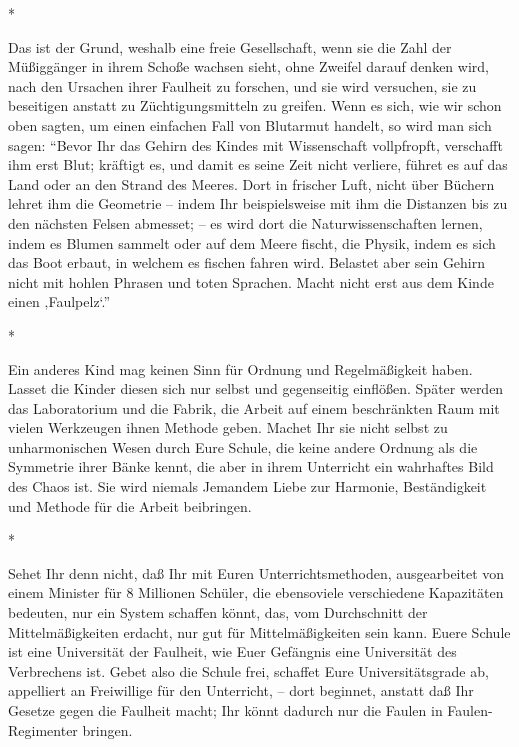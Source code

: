\documentclass{scrbook}
\begin{document}
\begin{center}*\end{center}

Das ist der Grund, weshalb eine freie Gesellschaft, wenn sie die Zahl der Müßiggänger in ihrem Schoße wachsen sieht, ohne Zweifel darauf denken wird, nach den Ursachen ihrer Faulheit zu forschen, und sie wird versuchen, sie zu beseitigen anstatt zu Züchtigungsmitteln zu greifen. Wenn es sich, wie wir schon oben sagten, um einen einfachen Fall von Blutarmut handelt, so wird man sich sagen: ``Bevor Ihr das Gehirn des Kindes mit Wissenschaft vollpfropft, verschafft ihm erst Blut; kräftigt es, und damit es seine Zeit nicht verliere, führet es auf das Land oder an den Strand des Meeres. Dort in frischer Luft, nicht über Büchern lehret ihm die Geometrie – indem Ihr beispielsweise mit ihm die Distanzen bis zu den nächsten Felsen abmesset; – es wird dort die Naturwissenschaften lernen, indem es Blumen sammelt oder auf dem Meere fischt, die Physik, indem es sich das Boot erbaut, in welchem es fischen fahren wird. Belastet aber sein Gehirn nicht mit hohlen Phrasen und toten Sprachen. Macht nicht erst aus dem Kinde einen ‚Faulpelz‘.''

\begin{center}*\end{center}

Ein anderes Kind mag keinen Sinn für Ordnung und Regelmäßigkeit haben. Lasset die Kinder diesen sich nur selbst und gegenseitig einflößen. Später werden das Laboratorium und die Fabrik, die Arbeit auf einem beschränkten Raum mit vielen Werkzeugen ihnen Methode geben. Machet Ihr sie nicht selbst zu unharmonischen Wesen durch Eure Schule, die keine andere Ordnung als die Symmetrie ihrer Bänke kennt, die aber in ihrem Unterricht ein wahrhaftes Bild des Chaos ist. Sie wird niemals Jemandem Liebe zur Harmonie, Beständigkeit und Methode für die Arbeit beibringen.

\begin{center}*\end{center}

Sehet Ihr denn nicht, daß Ihr mit Euren Unterrichtsmethoden, ausgearbeitet von einem Minister für 8 Millionen Schüler, die ebensoviele verschiedene Kapazitäten bedeuten, nur ein System schaffen könnt, das, vom Durchschnitt der Mittelmäßigkeiten erdacht, nur gut für Mittelmäßigkeiten sein kann. Euere Schule ist eine Universität der Faulheit, wie Euer Gefängnis eine Universität des Verbrechens ist. Gebet also die Schule frei, schaffet Eure Universitätsgrade ab, appelliert an Freiwillige für den Unterricht, – dort beginnet, anstatt daß Ihr Gesetze gegen die Faulheit macht; Ihr könnt dadurch nur die Faulen in Faulen-Regimenter bringen.
\end{document}
